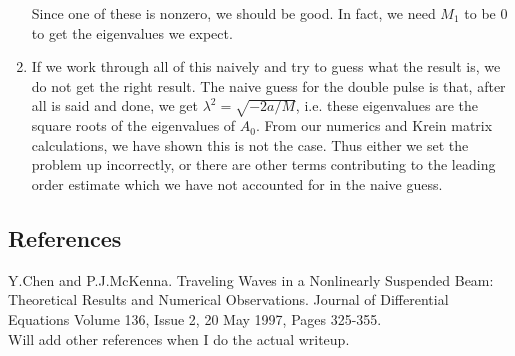 \documentclass[12pt]{article}
\begin{document}
\begin{enumerate}
Since one of these is nonzero, we should be good. In fact, we need $M_1$ to be 0 to get the eigenvalues we expect.

\item If we work through all of this naively and try to guess what the result is, we do not get the right result. The naive guess for the double pulse is that, after all is said and done, we get $\lambda^2 = \sqrt{-2a / M}$, i.e. these eigenvalues are the square roots of the eigenvalues of $A_0$. From our numerics and Krein matrix calculations, we have shown this is not the case. Thus either we set the problem up incorrectly, or there are other terms contributing to the leading order estimate which we have not accounted for in the naive guess.


\end{enumerate}

\subsection{References}

Y.Chen and P.J.McKenna. Traveling Waves in a Nonlinearly Suspended Beam: Theoretical Results and Numerical Observations. Journal of Differential Equations Volume 136, Issue 2, 20 May 1997, Pages 325-355.\\

Will add other references when I do the actual writeup.
\end{document}
